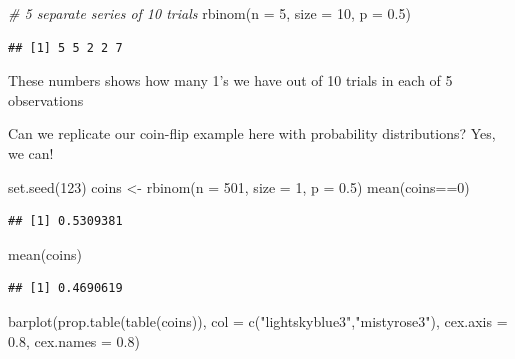 \documentclass[
]{book}
\newenvironment{Shaded}{\begin{snugshade}}{\end{snugshade}}
\newcommand{\AttributeTok}[1]{\textcolor[rgb]{0.77,0.63,0.00}{#1}}
\newcommand{\CommentTok}[1]{\textcolor[rgb]{0.56,0.35,0.01}{\textit{#1}}}
\newcommand{\DecValTok}[1]{\textcolor[rgb]{0.00,0.00,0.81}{#1}}
\newcommand{\FloatTok}[1]{\textcolor[rgb]{0.00,0.00,0.81}{#1}}
\newcommand{\FunctionTok}[1]{\textcolor[rgb]{0.00,0.00,0.00}{#1}}
\newcommand{\NormalTok}[1]{#1}
\newcommand{\OtherTok}[1]{\textcolor[rgb]{0.56,0.35,0.01}{#1}}
\newcommand{\SpecialCharTok}[1]{\textcolor[rgb]{0.00,0.00,0.00}{#1}}
\newcommand{\StringTok}[1]{\textcolor[rgb]{0.31,0.60,0.02}{#1}}
\begin{document}
\begin{Shaded}
\begin{Highlighting}[]
\CommentTok{\# 5 separate series of 10 trials}
\FunctionTok{rbinom}\NormalTok{(}\AttributeTok{n =} \DecValTok{5}\NormalTok{, }\AttributeTok{size =} \DecValTok{10}\NormalTok{, }\AttributeTok{p =} \FloatTok{0.5}\NormalTok{)}
\end{Highlighting}
\end{Shaded}

\begin{verbatim}
## [1] 5 5 2 2 7
\end{verbatim}

These numbers shows how many 1's we have out of 10 trials in each of 5 observations

Can we replicate our coin-flip example here with probability distributions? Yes, we can!

\begin{Shaded}
\begin{Highlighting}[]
\FunctionTok{set.seed}\NormalTok{(}\DecValTok{123}\NormalTok{)}
\NormalTok{coins }\OtherTok{\textless{}{-}} \FunctionTok{rbinom}\NormalTok{(}\AttributeTok{n =} \DecValTok{501}\NormalTok{, }\AttributeTok{size =} \DecValTok{1}\NormalTok{, }\AttributeTok{p =} \FloatTok{0.5}\NormalTok{)}
\FunctionTok{mean}\NormalTok{(coins}\SpecialCharTok{==}\DecValTok{0}\NormalTok{)}
\end{Highlighting}
\end{Shaded}

\begin{verbatim}
## [1] 0.5309381
\end{verbatim}

\begin{Shaded}
\begin{Highlighting}[]
\FunctionTok{mean}\NormalTok{(coins)}
\end{Highlighting}
\end{Shaded}

\begin{verbatim}
## [1] 0.4690619
\end{verbatim}

\begin{Shaded}
\begin{Highlighting}[]
\FunctionTok{barplot}\NormalTok{(}\FunctionTok{prop.table}\NormalTok{(}\FunctionTok{table}\NormalTok{(coins)),}
        \AttributeTok{col =} \FunctionTok{c}\NormalTok{(}\StringTok{"lightskyblue3"}\NormalTok{,}\StringTok{"mistyrose3"}\NormalTok{),}
        \AttributeTok{cex.axis =} \FloatTok{0.8}\NormalTok{, }\AttributeTok{cex.names =} \FloatTok{0.8}\NormalTok{)}
\end{Highlighting}
\end{Shaded}
\end{document}
